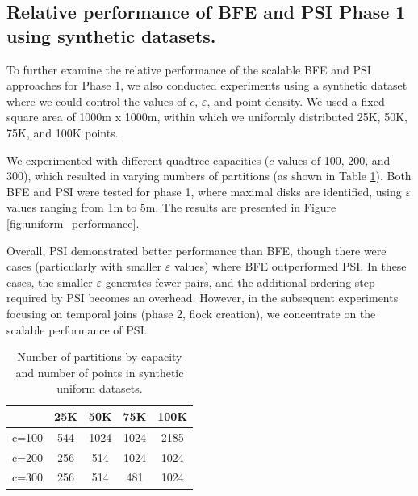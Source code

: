 \subsection{Relative performance of BFE and PSI Phase 1 using synthetic datasets.}
To further examine the relative performance of the scalable BFE and PSI approaches for Phase 1, we also conducted experiments using a synthetic dataset where we 
could control the values of $c$, $\varepsilon$, and point density. We used a fixed square area of 1000m x 1000m, within which we uniformly distributed 25K, 50K, 
75K, and 100K points.

We experimented with different quadtree capacities ($c$ values of 100, 200, and 300), which resulted in varying numbers of partitions (as shown in Table 
\ref{tab:uniform_ncells}). Both BFE and PSI were tested for phase 1, where maximal disks are identified, using $\varepsilon$ values ranging from 1m to 5m. The 
results are presented in Figure \ref{fig:uniform_performance}.

Overall, PSI demonstrated better performance than BFE, though there were cases (particularly with smaller $\varepsilon$ values) where BFE outperformed PSI. In 
these cases, the smaller $\varepsilon$ generates fewer pairs, and the additional ordering step required by PSI becomes an overhead. However, in the subsequent 
experiments focusing on temporal joins (phase 2, flock creation), we concentrate on the scalable performance of PSI.

\begin{table}
    \centering
    \caption{Number of partitions by capacity and number of points in synthetic uniform datasets.}
    \label{tab:uniform_ncells}
    \begin{tabular}{c|cccc}
              & 25K & 50K  & 75K  & 100K \\
        \hline
        c=100 & 544 & 1024 & 1024 & 2185 \\
        c=200 & 256 & 514  & 1024 & 1024 \\
        c=300 & 256 & 514  & 481  & 1024 \\
    \end{tabular}
\end{table}


